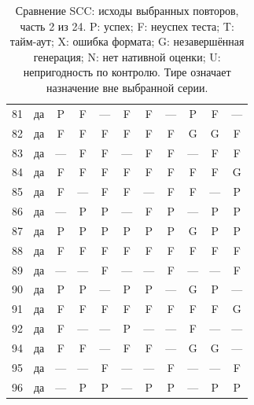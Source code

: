 \begin{table}[p]
\begin{tabular*}{\textwidth}{@{\extracolsep{\fill}}rc*{9}{c}@{}}
81 & да & P & F & — & F & F & — & P & F & —\\
82 & да & F & F & F & F & F & F & G & G & F\\
83 & да & — & F & F & — & F & F & — & F & F\\
84 & да & F & F & F & F & F & F & F & F & G\\
85 & да & F & — & F & F & — & F & F & — & P\\
86 & да & — & P & P & — & F & P & — & P & P\\
87 & да & P & P & P & P & P & P & G & P & P\\
88 & да & F & F & F & F & F & F & F & F & F\\
89 & да & — & — & F & — & — & F & — & — & F\\
90 & да & P & P & — & P & P & — & G & P & —\\
91 & да & F & F & F & F & F & F & F & F & G\\
92 & да & F & — & — & P & — & — & F & — & —\\
94 & да & F & F & — & F & F & — & G & G & —\\
95 & да & — & — & F & — & — & F & — & — & F\\
96 & да & — & P & P & — & P & P & — & P & P\\
\bottomrule\end{tabular*}
\caption{Сравнение SCC: исходы выбранных повторов, часть 2 из 24. P: успех; F: неуспех теста; T: тайм-аут; X: ошибка формата; G: незавершённая генерация; N: нет нативной оценки; U: непригодность по контролю. Тире означает назначение вне выбранной серии.}
\end{table}
\clearpage
